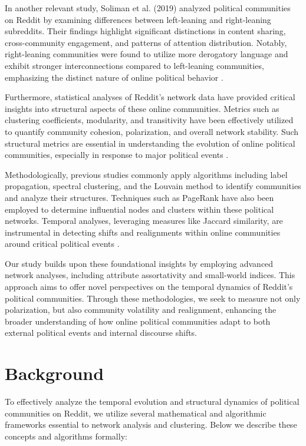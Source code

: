 \documentclass{article}
\begin{document}
In another relevant study, Soliman et al. (2019) analyzed political communities on Reddit by examining differences between left-leaning and right-leaning subreddits. Their findings highlight significant distinctions in content sharing, cross-community engagement, and patterns of attention distribution. Notably, right-leaning communities were found to utilize more derogatory language and exhibit stronger interconnections compared to left-leaning communities, emphasizing the distinct nature of online political behavior \cite{soliman2019characterization}.

Furthermore, statistical analyses of Reddit’s network data have provided critical insights into structural aspects of these online communities. Metrics such as clustering coefficients, modularity, and transitivity have been effectively utilized to quantify community cohesion, polarization, and overall network stability. Such structural metrics are essential in understanding the evolution of online political communities, especially in response to major political events \cite{statisticalanalysisnetwork}.

Methodologically, previous studies commonly apply algorithms including label propagation, spectral clustering, and the Louvain method to identify communities and analyze their structures. Techniques such as PageRank have also been employed to determine influential nodes and clusters within these political networks. Temporal analyses, leveraging measures like Jaccard similarity, are instrumental in detecting shifts and realignments within online communities around critical political events \cite{soliman2019characterization}.

Our study builds upon these foundational insights by employing advanced network analyses, including attribute assortativity and small-world indices. This approach aims to offer novel perspectives on the temporal dynamics of Reddit’s political communities. Through these methodologies, we seek to measure not only polarization, but also community volatility and realignment, enhancing the broader understanding of how online political communities adapt to both external political events and internal discourse shifts.


\section{Background}

To effectively analyze the temporal evolution and structural dynamics of political communities on Reddit, we utilize several mathematical and algorithmic frameworks essential to network analysis and clustering. Below we describe these concepts and algorithms formally:
\end{document}
